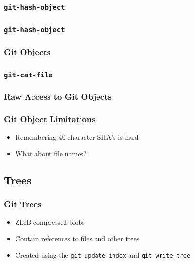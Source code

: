 \documentclass{beamer}
\begin{document}
\begin{frame}[fragile]
\frametitle{\texttt{git-hash-object}}

\end{frame}

\begin{frame}[fragile]
\frametitle{\texttt{git-hash-object}}

\end{frame}

\begin{frame}
\frametitle{Git Objects}
\begin{figure}
\end{figure}
\end{frame}


\begin{frame}[fragile]
\frametitle{\texttt{git-cat-file}}

\end{frame}

\begin{frame}[fragile]
\frametitle{Raw Access to Git Objects}

\end{frame}

\begin{frame}
\frametitle{Git Object Limitations}
\begin{itemize}
\item{Remembering 40 character SHA's is hard}
\item{What about file names?}
\end{itemize}
\end{frame}

\subsection{Trees}

\begin{frame}
\frametitle{Git Trees}
\begin{itemize}
\item{ZLIB compressed blobs}
\item{Contain references to files and other trees}
\item{Created using the \texttt{git-update-index} and \texttt{git-write-tree}}
\end{itemize}
\end{frame}
\end{document}
